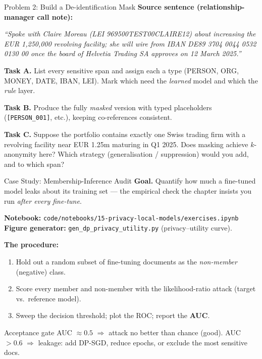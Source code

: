 \documentclass[9pt,t]{beamer}
\begin{document}
\begin{frame}{Problem 2: Build a De-identification Mask}
\textbf{Source sentence (relationship-manager call note):}

\medskip
\footnotesize
\emph{``Spoke with Claire Moreau (LEI 969500TEST00CLAIRE12) about increasing the
EUR 1,250,000 revolving facility; she will wire from IBAN
DE89 3704 0044 0532 0130 00 once the board of Helvetia Trading SA approves on
12 March 2025.''}

\medskip
\normalsize
\textbf{Task A.} List every sensitive span and assign each a type
(PERSON, ORG, MONEY, DATE, IBAN, LEI). Mark which need the \emph{learned} model and
which the \emph{rule} layer.

\medskip
\textbf{Task B.} Produce the fully \emph{masked} version with typed placeholders
(\texttt{[PERSON\_001]}, etc.), keeping co-references consistent.

\medskip
\textbf{Task C.} Suppose the portfolio contains exactly one Swiss trading firm with a
revolving facility near EUR 1.25m maturing in Q1 2025. Does masking achieve
$k$-anonymity here? Which strategy (generalisation / suppression) would you add, and
to which span?
\end{frame}

\begin{frame}{Case Study: Membership-Inference Audit}
\textbf{Goal.} Quantify how much a fine-tuned model leaks about its training set ---
the empirical check the chapter insists you run \emph{after every fine-tune}.

\medskip
\textbf{Notebook:} \texttt{code/notebooks/15-privacy-local-models/exercises.ipynb}\\
\textbf{Figure generator:} \texttt{gen\_dp\_privacy\_utility.py} (privacy--utility curve).

\medskip
\textbf{The procedure:}
\begin{enumerate}
  \item Hold out a random subset of fine-tuning documents as the \emph{non-member}
        (negative) class.
  \item Score every member and non-member with the likelihood-ratio attack
        (target vs.\ reference model).
  \item Sweep the decision threshold; plot the ROC; report the \textbf{AUC}.
\end{enumerate}

\medskip
\begin{alertblock}{Acceptance gate}
AUC $\approx 0.5$ $\Rightarrow$ attack no better than chance (good). AUC $> 0.6$
$\Rightarrow$ leakage: add DP-SGD, reduce epochs, or exclude the most sensitive docs.
\end{alertblock}
\end{frame}
\end{document}
